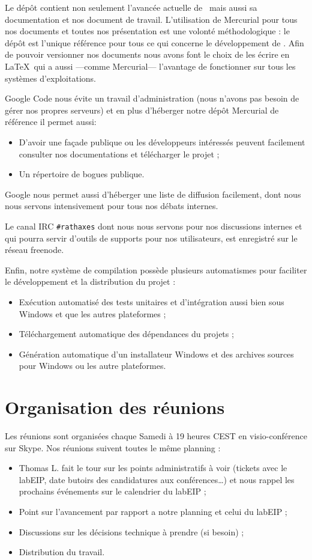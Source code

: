 \documentclass[francais]{rtxreport}
\begin{document}
Le dépôt contient non seulement l'avancée actuelle de \rtx\ mais aussi sa
documentation et nos document de travail. L'utilisation de Mercurial pour tous
nos documents et toutes nos présentation est une volonté méthodologique : le
dépôt est l'unique référence pour tous ce qui concerne le développement de \rtx.
Afin de pouvoir versionner nos documents nous avons font le choix de les écrire
en \LaTeX\ qui a aussi ---comme Mercurial--- l'avantage de fonctionner sur tous
les systèmes d'exploitations.

Google Code nous évite un travail d'administration (nous n'avons pas besoin de
gérer nos propres serveurs) et en plus d'héberger notre dépôt Mercurial de
référence il permet aussi:
\begin{itemize}
\item D'avoir une façade publique ou les développeurs intéressés peuvent
  facilement consulter nos documentations et télécharger le projet ;
\item Un répertoire de bogues publique.
\end{itemize}
Google nous permet aussi d'héberger une liste de diffusion facilement, dont nous
nous servons intensivement pour tous nos débats internes.

Le canal IRC \texttt{\#rathaxes} dont nous nous servons pour nos discussions
internes et qui pourra servir d'outils de supports pour nos utilisateurs, est
enregistré sur le réseau freenode.

Enfin, notre système de compilation possède plusieurs automatismes pour
faciliter le développement et la distribution du projet :
\begin{itemize}
\item Exécution automatisé des tests unitaires et d'intégration aussi bien sous
  Windows et que les autres plateformes ;
\item Téléchargement automatique des dépendances du projets ;
\item Génération automatique d'un installateur Windows et des archives sources
  pour Windows ou les autre plateformes.
\end{itemize}

\section{Organisation des réunions}

Les réunions sont organisées chaque Samedi à 19 heures CEST en visio-conférence
sur Skype. Nos réunions suivent toutes le même planning :
\begin{itemize}
\item Thomas L. fait le tour sur les points administratifs à voir (tickets avec
  le labEIP, date butoirs des candidatures aux conférences\ldots) et nous rappel
  les prochains événements sur le calendrier du labEIP ;
\item Point sur l'avancement par rapport a notre planning et celui du labEIP ;
\item Discussions sur les décisions technique à prendre (si besoin) ;
\item Distribution du travail.
\end{itemize}
\end{document}
